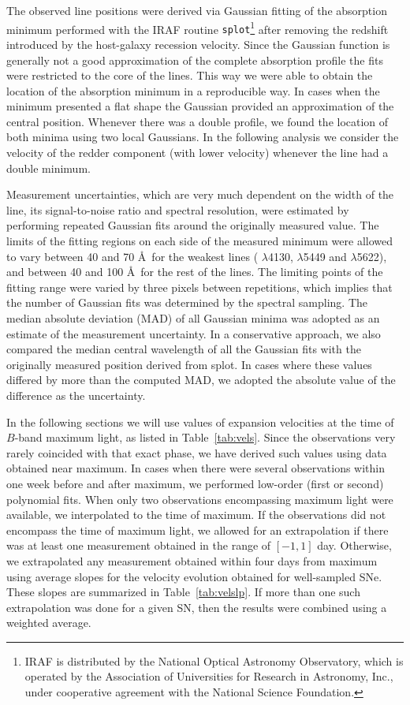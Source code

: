 \documentclass[apj]{emulateapj-rtx4}
\begin{document}
The observed line positions were derived via Gaussian fitting of the 
absorption minimum performed with the IRAF routine
{\tt splot}\footnote{IRAF is distributed by the National Optical Astronomy
  Observatory, which is operated by the Association of Universities
  for Research in Astronomy, Inc., under cooperative agreement with
  the National Science Foundation.} after removing the redshift
introduced by the host-galaxy recession velocity. Since the
  Gaussian function is generally not a good approximation of the
  complete absorption profile the fits were restricted to the core of
  the lines. This way we were able to obtain the location of the
  absorption minimum in a reproducible way. In cases when the minimum
presented a flat shape the Gaussian provided an approximation of the
central position. Whenever there was a double profile, we found the
location of both minima using two local Gaussians. In the following
analysis we consider the velocity of the redder component (with lower
velocity) whenever the line had a double minimum.

Measurement uncertainties, which are very much dependent on the width of
the line, its signal-to-noise ratio and spectral resolution, 
were estimated by performing repeated Gaussian fits
around the originally measured value. The limits of the fitting
regions on each side of the measured minimum were allowed to vary
between 40 and 70 \AA\ for the weakest lines (
$\lambda$4130,  $\lambda$5449 and 
$\lambda$5622), and between 40 and 100 \AA\ for the rest of the
lines. The limiting points of the fitting range were varied by three
pixels between repetitions, which implies that the number of Gaussian
fits was determined by the spectral sampling. The median absolute
deviation (MAD) of all Gaussian minima was adopted as an estimate of the
measurement uncertainty. In a conservative approach, we also compared
the median central wavelength 
of all the Gaussian fits with the originally measured position derived
from splot. In cases where these values differed by more than the
computed MAD, we adopted the absolute value of the difference as the
uncertainty. 

In the following sections we will use values of expansion velocities
at the time of $B$-band maximum light, as listed in
Table~\ref{tab:vels}. Since the observations very rarely coincided with
that exact phase, we have derived such values using data obtained near
maximum. In cases when there were several observations within one week
before and after maximum, we performed low-order (first or second)
polynomial fits. When only two observations encompassing maximum light
were available, we interpolated to the time of maximum. If the
  observations did not encompass the time of maximum light, we allowed for
  an extrapolation if there was at least one measurement obtained in
  the range of $[-1,1]$ day. Otherwise, we extrapolated any
  measurement obtained within four days from maximum using average slopes
for the velocity evolution obtained for well-sampled SNe. These slopes
are summarized in Table~\ref{tab:velslp}. If more than one such
extrapolation was done for a given SN, then the results were combined
using a weighted average.
\end{document}
